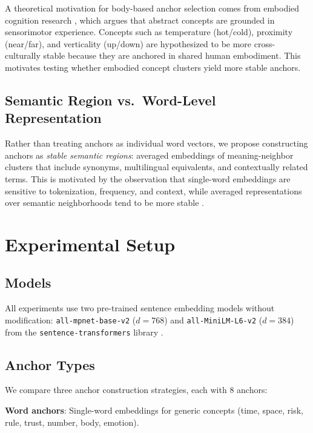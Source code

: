 \documentclass[11pt,a4paper]{article}
\begin{document}
A theoretical motivation for body-based anchor selection comes from
embodied cognition research \cite{lakoff1999philosophy}, which argues
that abstract concepts are grounded in sensorimotor experience. Concepts
such as temperature (hot/cold), proximity (near/far), and verticality
(up/down) are hypothesized to be more cross-culturally stable because
they are anchored in shared human embodiment. This motivates testing
whether embodied concept clusters yield more stable anchors.

\subsection{Semantic Region vs.\ Word-Level Representation}

Rather than treating anchors as individual word vectors, we propose
constructing anchors as \textit{stable semantic regions}: averaged
embeddings of meaning-neighbor clusters that include synonyms,
multilingual equivalents, and contextually related terms. This is
motivated by the observation that single-word embeddings are sensitive
to tokenization, frequency, and context, while averaged representations
over semantic neighborhoods tend to be more stable \cite{wieting2016towards}.

\section{Experimental Setup}
\label{sec:setup}

\subsection{Models}

All experiments use two pre-trained sentence embedding models without
modification: \texttt{all-mpnet-base-v2} ($d = 768$) and
\texttt{all-MiniLM-L6-v2} ($d = 384$) from the
\texttt{sentence-transformers} library \cite{reimers2019sentence}.

\subsection{Anchor Types}

We compare three anchor construction strategies, each with 8 anchors:

\textbf{Word anchors}: Single-word embeddings for generic concepts
(time, space, risk, rule, trust, number, body, emotion).
\end{document}
